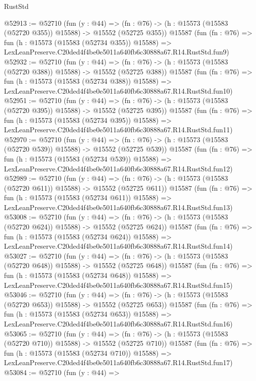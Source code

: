 \begin{lexlean}{RustStd}
\begin{coremodule}
@52913 := @52710
    (fun (y : @44) =>
    (fn : @76) -> (h : @15573 (@15583 (@52720 @355)) @15588) -> @15552 (@52725 @355))
    @15587
    (fun (fn : @76) =>
    fun (h : @15573 (@15583 (@52734 @355)) @15588) =>
    LexLeanPreserve.C20ded4f4be0e5011a640fb6c30888a67.R14.RustStd.fun9)
@52932 := @52710
    (fun (y : @44) =>
    (fn : @76) -> (h : @15573 (@15583 (@52720 @388)) @15588) -> @15552 (@52725 @388))
    @15587
    (fun (fn : @76) =>
    fun (h : @15573 (@15583 (@52734 @388)) @15588) =>
    LexLeanPreserve.C20ded4f4be0e5011a640fb6c30888a67.R14.RustStd.fun10)
@52951 := @52710
    (fun (y : @44) =>
    (fn : @76) -> (h : @15573 (@15583 (@52720 @395)) @15588) -> @15552 (@52725 @395))
    @15587
    (fun (fn : @76) =>
    fun (h : @15573 (@15583 (@52734 @395)) @15588) =>
    LexLeanPreserve.C20ded4f4be0e5011a640fb6c30888a67.R14.RustStd.fun11)
@52970 := @52710
    (fun (y : @44) =>
    (fn : @76) -> (h : @15573 (@15583 (@52720 @539)) @15588) -> @15552 (@52725 @539))
    @15587
    (fun (fn : @76) =>
    fun (h : @15573 (@15583 (@52734 @539)) @15588) =>
    LexLeanPreserve.C20ded4f4be0e5011a640fb6c30888a67.R14.RustStd.fun12)
@52989 := @52710
    (fun (y : @44) =>
    (fn : @76) -> (h : @15573 (@15583 (@52720 @611)) @15588) -> @15552 (@52725 @611))
    @15587
    (fun (fn : @76) =>
    fun (h : @15573 (@15583 (@52734 @611)) @15588) =>
    LexLeanPreserve.C20ded4f4be0e5011a640fb6c30888a67.R14.RustStd.fun13)
@53008 := @52710
    (fun (y : @44) =>
    (fn : @76) -> (h : @15573 (@15583 (@52720 @624)) @15588) -> @15552 (@52725 @624))
    @15587
    (fun (fn : @76) =>
    fun (h : @15573 (@15583 (@52734 @624)) @15588) =>
    LexLeanPreserve.C20ded4f4be0e5011a640fb6c30888a67.R14.RustStd.fun14)
@53027 := @52710
    (fun (y : @44) =>
    (fn : @76) -> (h : @15573 (@15583 (@52720 @648)) @15588) -> @15552 (@52725 @648))
    @15587
    (fun (fn : @76) =>
    fun (h : @15573 (@15583 (@52734 @648)) @15588) =>
    LexLeanPreserve.C20ded4f4be0e5011a640fb6c30888a67.R14.RustStd.fun15)
@53046 := @52710
    (fun (y : @44) =>
    (fn : @76) -> (h : @15573 (@15583 (@52720 @653)) @15588) -> @15552 (@52725 @653))
    @15587
    (fun (fn : @76) =>
    fun (h : @15573 (@15583 (@52734 @653)) @15588) =>
    LexLeanPreserve.C20ded4f4be0e5011a640fb6c30888a67.R14.RustStd.fun16)
@53065 := @52710
    (fun (y : @44) =>
    (fn : @76) -> (h : @15573 (@15583 (@52720 @710)) @15588) -> @15552 (@52725 @710))
    @15587
    (fun (fn : @76) =>
    fun (h : @15573 (@15583 (@52734 @710)) @15588) =>
    LexLeanPreserve.C20ded4f4be0e5011a640fb6c30888a67.R14.RustStd.fun17)
@53084 := @52710
    (fun (y : @44) =>

\end{coremodule}
\end{lexlean}
